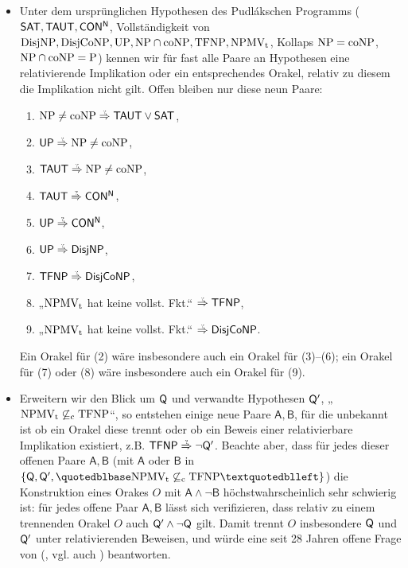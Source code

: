 \begin{itemize}[parsep=0pt,listparindent=\parindent,itemsep=5pt plus 1pt minus 1pt,midpenalty=0]
    \item Unter dem ursprünglichen Hypothesen des Pudlákschen Programms ($\mathsf{SAT}, \mathsf{TAUT}, \mathsf{CON^N}$, Vollständigkeit von $\mathrm{DisjNP}, \mathrm{DisjCoNP}, \mathrm{UP}, \mathrm{NP}\cap\mathrm{coNP}, \mathrm{TFNP}, \mathrm{NPMV_t}$, Kollaps $\mathrm{NP}=\mathrm{coNP}$, $\mathrm{NP}\cap\mathrm{coNP}=\mathrm{P}$) kennen wir für fast alle Paare an Hypothesen eine relativierende Implikation oder ein entsprechendes Orakel, relativ zu diesem die Implikation nicht gilt. Offen bleiben nur diese neun Paare:
        \begin{enumerate}[nosep,midpenalty=0]
            \item $\NP\neq\coNP\stackrel{\smash{\text{\raisebox{-1pt}{\tiny ?}}}}{\Rightarrow} \hTAUT\lor\hSAT$,
            \item $\hUP\stackrel{\smash{\text{\raisebox{-1pt}{\tiny ?}}}}{\Rightarrow}\NP\neq\coNP$,
            \item $\hTAUT\stackrel{\smash{\text{\raisebox{-1pt}{\tiny ?}}}}{\Rightarrow}\NP\neq\coNP$,
            \item $\hTAUT\stackrel{\smash{\text{\raisebox{-1pt}{\tiny ?}}}}{\Rightarrow}\mathsf{CON^N}$,
            \item $\hUP\stackrel{\smash{\text{\raisebox{-1pt}{\tiny ?}}}}{\Rightarrow}\mathsf{CON^N}$,
            \item $\hUP\stackrel{\smash{\text{\raisebox{-1pt}{\tiny ?}}}}{\Rightarrow}\hDisjNP$,
            \item $\hTFNP\stackrel{\smash{\text{\raisebox{-1pt}{\tiny ?}}}}{\Rightarrow} \hDisjCoNP$,
            \item „$\mathrm{NPMV_t}$ hat keine vollst. Fkt.“ $\stackrel{\smash{\text{\raisebox{-1pt}{\tiny ?}}}}{\Rightarrow} \hTFNP$,
            \item „$\mathrm{NPMV_t}$ hat keine vollst. Fkt.“ $\stackrel{\smash{\text{\raisebox{-1pt}{\tiny ?}}}}{\Rightarrow} \hDisjCoNP$.
        \end{enumerate}
        Ein Orakel für (2) wäre insbesondere auch ein Orakel für (3)--(6); ein Orakel für (7) oder (8) wäre insbesondere auch ein Orakel für (9).
        
    \item Erweitern wir den Blick um $\mathsf{Q}$ und verwandte Hypothesen $\mathsf{Q}'$, „$\mathrm{NPMV_t}\not\subseteq_\mathrm{c} \mathrm{TFNP}$“, so entstehen einige neue Paare $\mathsf{A,B}$, für die unbekannt ist ob ein Orakel diese trennt oder ob ein Beweis einer relativierbare Implikation existiert, z.B. $\hTFNP\stackrel{\smash{\text{\raisebox{-1pt}{\tiny ?}}}}{\Rightarrow}\neg\hQ'$. Beachte aber, dass für jedes dieser offenen Paare $\mathsf{A,B}$ (mit $\mathsf A$ oder $\mathsf B$ in $\{\hQ, \hQ', „\NPMVt\not\subseteqc \TFNP“\}$) die Konstruktion eines Orakes $O$ mit $\mathsf{A\land \neg B}$ höchstwahrscheinlich sehr schwierig ist: für jedes offene Paar $\mathsf{A,B}$ lässt sich verifizieren, dass relativ zu einem trennenden Orakel $O$ auch $\mathsf{Q}'\land \neg \mathsf{Q}$ gilt. Damit trennt $O$ insbesondere $\mathsf{Q}$ und $\mathsf{Q}'$ unter relativierenden Beweisen, und würde eine seit 28 Jahren offene Frage von \citeauthor{fenner_inverting_2003} (\citeyear{fenner_inverting_2003}, vgl. auch \citeyear{fenner_inverting_1996}) beantworten.


\end{itemize}
